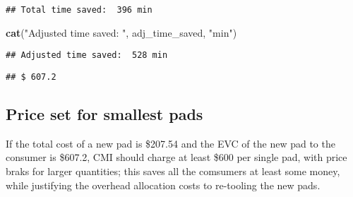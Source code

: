 \documentclass[]{article}
\newenvironment{Shaded}{\begin{snugshade}}{\end{snugshade}}
\newcommand{\KeywordTok}[1]{\textcolor[rgb]{0.13,0.29,0.53}{\textbf{#1}}}
\newcommand{\DecValTok}[1]{\textcolor[rgb]{0.00,0.00,0.81}{#1}}
\newcommand{\StringTok}[1]{\textcolor[rgb]{0.31,0.60,0.02}{#1}}
\newcommand{\CommentTok}[1]{\textcolor[rgb]{0.56,0.35,0.01}{\textit{#1}}}
\newcommand{\OperatorTok}[1]{\textcolor[rgb]{0.81,0.36,0.00}{\textbf{#1}}}
\newcommand{\NormalTok}[1]{#1}
\begin{document}
\begin{verbatim}
## Total time saved:  396 min
\end{verbatim}

\begin{Shaded}
\begin{Highlighting}[]
\KeywordTok{cat}\NormalTok{(}\StringTok{"Adjusted time saved: "}\NormalTok{, adj_time_saved, }\StringTok{"min"}\NormalTok{)}
\end{Highlighting}
\end{Shaded}

\begin{verbatim}
## Adjusted time saved:  528 min
\end{verbatim}

\begin{Shaded}
\end{Shaded}

\begin{verbatim}
## $ 607.2
\end{verbatim}

\subsection{Price set for smallest
pads}\label{price-set-for-smallest-pads}

If the total cost of a new pad is \$207.54 and the EVC of the new pad to
the consumer is \$607.2, CMI should charge at least \$600 per single
pad, with price braks for larger quantities; this saves all the
comsumers at least some money, while justifying the overhead allocation
costs to re-tooling the new pads.
\end{document}
